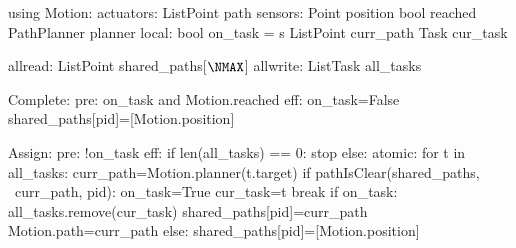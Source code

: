 using Motion:
  actuators:
    List\<Point\> path
  sensors:
    Point position
    bool reached
    PathPlanner planner
local:
  bool on_task = s
  List\<Point\> curr_path
  Task cur_task

allread:
  List\<Point\> shared_paths[$\NMAX$]
allwrite:
  List\<Task\> all_tasks

Complete:
pre: on_task and Motion.reached
eff: on_task=False
shared_paths[pid]=[Motion.position]

Assign:
  pre: !on_task
  eff:
     if len(all_tasks) == 0:
        stop
     else: atomic:
        for t in all_tasks:
           curr_path=Motion.planner(t.target)
           if pathIsClear(shared_paths, \
                             curr_path, pid):
              on_task=True
              cur_task=t
              break
        if on_task:
           all_tasks.remove(cur_task)
           shared_paths[pid]=curr_path
           Motion.path=curr_path
        else:
           shared_paths[pid]=[Motion.position]
